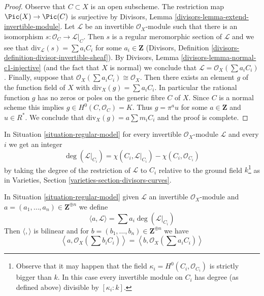 \begin{proof}
Observe that $C \subset X$ is an open subscheme. The restriction
map $\Pic(X) \to \Pic(C)$ is surjective by
Divisors, Lemma \ref{divisors-lemma-extend-invertible-module}.
Let $\mathcal{L}$ be an invertible $\mathcal{O}_X$-module
such that there is an isomorphism $s : \mathcal{O}_C \to \mathcal{L}|_C$.
Then $s$ is a regular meromorphic section of $\mathcal{L}$
and we see that $\text{div}_\mathcal{L}(s) = \sum a_i C_i$
for some $a_i \in \mathbf{Z}$
(Divisors, Definition \ref{divisors-definition-divisor-invertible-sheaf}).
By Divisors, Lemma \ref{divisors-lemma-normal-c1-injective}
(and the fact that $X$ is normal)
we conclude that $\mathcal{L} = \mathcal{O}_X(\sum a_iC_i)$.
Finally, suppose that $\mathcal{O}_X(\sum a_i C_i) \cong \mathcal{O}_X$.
Then there exists an element $g$ of the function field of $X$
with $\text{div}_X(g) = \sum a_i C_i$. In particular the rational
function $g$ has no zeros or poles on the generic fibre $C$ of $X$.
Since $C$ is a normal scheme this implies $g \in H^0(C, \mathcal{O}_C) = K$.
Thus $g = \pi^a u$ for some $a \in \mathbf{Z}$ and $u \in R^*$.
We conclude that $\text{div}_X(g) = a \sum m_i C_i$ and the proof
is complete.
\end{proof}

\noindent
In Situation \ref{situation-regular-model} for every invertible
$\mathcal{O}_X$-module $\mathcal{L}$ and every $i$ we get an integer
$$
\deg(\mathcal{L}|_{C_i}) =
\chi(C_i, \mathcal{L}|_{C_i}) - \chi(C_i, \mathcal{O}_{C_i})
$$
by taking the degree of the restriction of $\mathcal{L}$ to $C_i$
relative to the ground field $k$\footnote{Observe that it may happen
that the field $\kappa_i = H^0(C_i, \mathcal{O}_{C_i})$ is strictly bigger
than $k$. In this case every invertible module on $C_i$ has
degree (as defined above) divisible by $[\kappa_i : k]$.}
as in Varieties, Section \ref{varieties-section-divisors-curves}.

\begin{lemma}
\label{lemma-intersection-pairing}
In Situation \ref{situation-regular-model} given $\mathcal{L}$ an invertible
$\mathcal{O}_X$-module and
$a = (a_1, \ldots, a_n) \in \mathbf{Z}^{\oplus n}$ we define
$$
\langle a, \mathcal{L} \rangle = \sum a_i\deg(\mathcal{L}|_{C_i})
$$
Then $\langle , \rangle$ is bilinear and for
$b = (b_1, \ldots, b_n) \in \mathbf{Z}^{\oplus n}$ we have
$$
\left\langle a, \mathcal{O}_X(\sum b_i C_i) \right\rangle =
\left\langle b, \mathcal{O}_X(\sum a_i C_i) \right\rangle
$$
\end{lemma}

